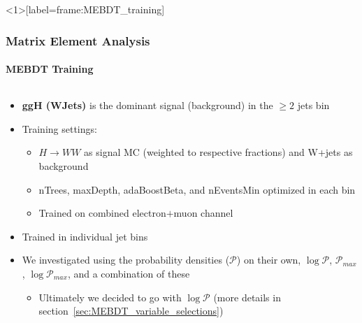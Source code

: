 \begin{frame}<1>[label=frame:MEBDT_training]
	\frametitle{Matrix Element Analysis}
	\framesubtitle{MEBDT Training}
	\vspace*{-0.35cm}

	\begin{columns}[T]
		\vspace*{-0.25cm}
		\begin{block}{}
			\begin{itemize}
				\small
				\item \textbf{ggH (WJets)} is the dominant signal (background) in the $\geqslant2$ jets bin
				\item Training settings:
				\begin{itemize}
					\item $H{\rightarrow}WW$ as signal MC (weighted to respective fractions) and W+jets as background
					\item nTrees, maxDepth, adaBoostBeta, and nEventsMin optimized in each bin
					\item Trained on combined electron$+$muon channel
				\end{itemize}
				\item Trained in individual jet bins
				\item We investigated using the probability densities ($\mathcal{P}$) on their own, $\log{\mathcal{P}}$, $\mathcal{P}_{max}$, $\log{\mathcal{P}_{max}}$, and a combination of these
				\begin{itemize}
					\item Ultimately we decided to go with $\log{\mathcal{P}}$ (more details in section~\ref{sec:MEBDT_variable_selections})
				\end{itemize}
			\end{itemize}
		\end{block}
\end{columns}
\end{frame}
